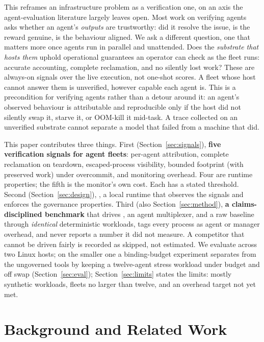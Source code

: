 This reframes an infrastructure problem as a verification one, on an axis the agent-evaluation
literature largely leaves open. Most work on verifying agents asks whether an agent's \emph{outputs}
are trustworthy: did it resolve the issue, is the reward genuine, is the behaviour aligned. We ask a
different question, one that matters more once agents run in parallel and unattended. Does the
\emph{substrate that hosts them} uphold operational guarantees an operator can check as the fleet
runs: accurate accounting, complete reclamation, and no silently lost work? These are always-on
signals over the live execution, not one-shot scores. A fleet whose host cannot answer them is
unverified, however capable each agent is. This is a precondition for verifying agents rather
than a detour around it: an agent's observed behaviour is attributable and reproducible only if the
host did not silently swap it, starve it, or OOM-kill it mid-task. A trace collected on an unverified
substrate cannot separate a model that failed from a machine that did.

This paper contributes three things. First (Section~\ref{sec:signals}), \textbf{five verification
signals for agent fleets}: per-agent attribution, complete reclamation on teardown, escaped-process
visibility, bounded footprint (with preserved work) under overcommit, and monitoring overhead. Four
are runtime properties; the fifth is the monitor's own cost. Each has a stated threshold. Second
(Section~\ref{sec:design}), \textbf{\sys{}}, a local runtime that observes the signals and enforces
the governance properties. Third (also Section~\ref{sec:method}), \textbf{a claims-disciplined benchmark}
that drives , an agent multiplexer, and a raw baseline through \emph{identical}
deterministic workloads, tags every process as agent or manager overhead, and never reports a number
it did not measure. A competitor that cannot be driven fairly is recorded as skipped, not estimated.
We evaluate across two Linux hosts; on the smaller one a binding-budget experiment separates \sys{} from the ungoverned tools by
keeping a twelve-agent stress workload under budget and off swap (Section~\ref{sec:eval});
Section~\ref{sec:limits} states the limits: mostly synthetic workloads, fleets no larger than twelve,
and an overhead target not yet met.

\section{Background and Related Work}

